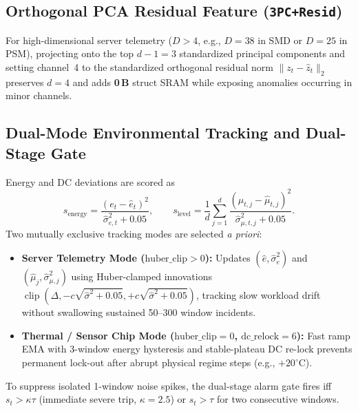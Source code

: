 \documentclass[conference]{IEEEtran}
\begin{document}
\subsection{Orthogonal PCA Residual Feature (\texttt{3PC+Resid})}
For high-dimensional server telemetry ($D > 4$, e.g., $D=38$ in SMD or $D=25$ in PSM), projecting onto the top $d-1=3$ standardized principal components and setting channel~4 to the standardized orthogonal residual norm $\|z_t - \hat{z}_t\|_2$ preserves $d=4$ and adds \textbf{0\,B} struct SRAM while exposing anomalies occurring in minor channels.

\subsection{Dual-Mode Environmental Tracking and Dual-Stage Gate}
Energy and DC deviations are scored as
\begin{equation}
  s_{\text{energy}} = \frac{(e_t - \hat{e}_t)^2}{\hat{\sigma}_{e,t}^2 + 0.05}, \qquad
  s_{\text{level}} = \frac{1}{d}\sum_{j=1}^{d} \frac{(\mu_{t,j} - \hat{\mu}_{t,j})^2}{\hat{\sigma}_{\mu,t,j}^2 + 0.05}.
\end{equation}
Two mutually exclusive tracking modes are selected \emph{a priori}:
\begin{itemize}
  \item \textbf{Server Telemetry Mode ($\text{huber\_clip} > 0$):} Updates $(\hat{e}, \hat{\sigma}_e^2)$ and $(\hat{\mu}_j, \hat{\sigma}_{\mu,j}^2)$ using Huber-clamped innovations $\operatorname{clip}(\Delta, -c\sqrt{\hat{\sigma}^2+0.05}, +c\sqrt{\hat{\sigma}^2+0.05})$, tracking slow workload drift without swallowing sustained 50--300 window incidents.
  \item \textbf{Thermal / Sensor Chip Mode ($\text{huber\_clip} = 0$, $\text{dc\_relock} = 6$):} Fast ramp EMA with 3-window energy hysteresis and stable-plateau DC re-lock prevents permanent lock-out after abrupt physical regime steps (e.g., $+20^\circ\text{C}$).
\end{itemize}
To suppress isolated 1-window noise spikes, the dual-stage alarm gate fires iff $s_t > \kappa \tau$ (immediate severe trip, $\kappa = 2.5$) or $s_t > \tau$ for two consecutive windows.
\end{document}
